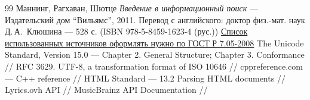 \begin{thebibliography}{99}
Маннинг, Рагхаван, Шютце
{\itshape Введение в информационный поиск} --- Издательский дом \enquote{Вильямс}, 2011. Перевод с английского: доктор физ.-мат. наук Д.\,А.\, Клюшина --- 528 с. (ISBN 978-5-8459-1623-4 (рус.))
\href{http://www.ifap.ru/library/gost/7052008.pdf}{Список использованных источников оформлять нужно по  ГОСТ Р 7.05-2008}
The Unicode Standard, Version 15.0 --- Chapter 2. General Structure; Chapter 3. Conformance // 
RFC 3629. UTF-8, a transformation format of ISO 10646 // 
cppreference.com --- C++ reference // 
HTML Standard --- 13.2 Parsing HTML documents // 
Lyrics.ovh API // 
MusicBrainz API Documentation // 
\end{thebibliography}
\pagebreak
